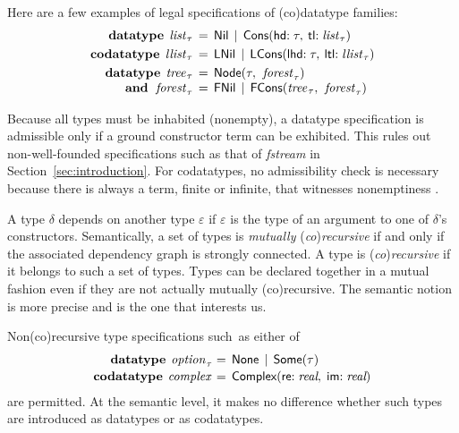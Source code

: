 \documentclass[smallcondensed,draft]{svjour3}
\newcommand\keyw[1]{\textbf{#1}}
\newcommand\const[1]{\textsf{#1}}
\newcommand\ty[1]{\textit{#1}}
\newcommand\vthinspace{\kern+0.083333em}
\begin{document}
Here are a few examples of legal specifications of (co)datatype families:
\[\begin{aligned}[t]
      \keyw{datatype}\; \,\ty{list}_{\vthinspace\tau} & \,=\, \const{Nil} \,\mid\, \const{Cons}(\const{hd}{:}\;
      \tau,\: \const{tl}{:}\; \ty{list}_{\vthinspace\tau}) \\%
      \keyw{codatatype}\; \,\ty{llist}_{\vthinspace\tau} & \,=\, \const{LNil} \,\mid\, \const{LCons}(\const{lhd}{:}\;
      \tau,\: \const{ltl}{:}\;
      \ty{llist}_{\vthinspace\tau}) \\%
      \keyw{datatype}\;\, \ty{tree}_{\vthinspace\tau} & \,=\, \const{Node}(\tau,\:\, \ty{forest}_{\vthinspace\tau}) \\[-\jot]
      \keyw{and}\;\,\, \ty{forest}_{\vthinspace\tau} & \,=\, \const{FNil} \,\mid\, \const{FCons}(\ty{tree}_{\vthinspace\tau},\:\, \ty{forest}_{\vthinspace\tau})
\end{aligned}
\]

Because all types must be inhabited (nonempty), a datatype specification is
admissible only if a ground constructor term can be exhibited.
This rules out non-well-founded specifications such as
that of \ty{fstream} in Section~\ref{sec:introduction}.
For codatatypes, no admissibility check is necessary because there is always a term,
finite or infinite, that witnesses nonemptiness \cite{blanchette-et-al-2015-esop}.

A type $\delta$ depends on another type $\varepsilon$ if $\varepsilon$ is the
type of an argument to one of $\delta$'s constructors. Semantically, a set of
types is \emph{mutually} (\emph{co})\emph{recursive} if and only if the
associated dependency graph is strongly connected.
A type is (\emph{co})\emph{recursive} if it belongs to such a set of types.
Types can be declared together in a mutual fashion even if they are not actually
mutually (co)recursive. The semantic notion is more precise and is the one that interests
us.

Non(co)recursive type specifications such~as either of
\[\begin{aligned}[t]
      \keyw{datatype}~\vthinspace\ty{option}_{\vthinspace\tau\!} & \,=\, \const{None} \,\mid\, \const{Some}(\tau) \\[-.5\jot]
      \keyw{codatatype}~\vthinspace\ty{complex} & \,=\, \const{Complex}(\const{re}{:}\; \ty{real},\; \const{im}{:}\;\ty{real})
\end{aligned}
\]
are permitted.
At the semantic level, it makes no difference whether
such types are introduced as datatypes or as codatatypes.
\end{document}
